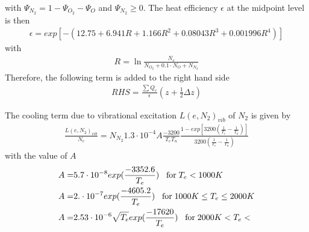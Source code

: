 %
with $\Psi_{N_2} = 1 - \Psi_{O_2} - \Psi_{O}$ and $\Psi_{N_2} \geq 0$.
The heat efficiency $\epsilon$ at the midpoint level is then
%
\begin{align}
 \epsilon = exp \left[ - \left( 12.75 + 6.941 R + 1.166 R^2 + 0.08043 R^3 + 0.001996 R^4 \right)\right]
\end{align}
%
with
%
\begin{align}
  R = \ln{\frac{N_e}{N_{O_2} + 0.1 \cdot N_{O}+ N_{N_2}}}
\end{align}
%
Therefore, the following term is added to  the right hand side
%
\begin{align}
  RHS = \frac{\sum Q_e}{\epsilon}(z + \frac{1}{2} \Delta z)
\end{align}
%

The cooling term due to vibrational excitation $L(e,N_2)_{vib}$
of $N_2$ is given by
%
\begin{align}
  \frac{L(e,N_2)_{vib}}{N_e } = N_{N_2} 1.3 \cdot 10^{-4} A
      \frac{-3200}{T_e T_n} \frac{1 - exp\left[ 3200 \left(
          \frac{1}{T_e}-\frac{1}{T_n}\right)\right]}{3200 \left(
          \frac{1}{T_e}-\frac{1}{T_n}\right)}
\end{align}
%
with the value of $A$
%
\begin{align}
   A = & 5.7 \cdot 10^{-8} exp(\frac{-3352.6}{T_e}) \; \; \; \text{for} \; T_e < 1000 K \notag \\
   A = & 2. \cdot 10^{-7} exp(\frac{-4605.2}{T_e}) \; \; \; \text{for} \; 1000 K \leq T_e \leq 2000 K \notag \\
   A = & 2.53 \cdot 10^{-6}\sqrt{T_e} exp(\frac{-17620}{T_e}) \; \; \; \text{for} \; 2000 K < T_e <  \notag
\end{align}
%

